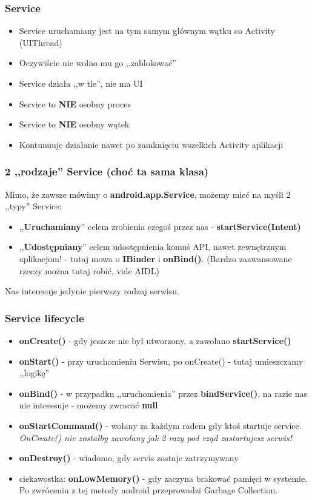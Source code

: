 \documentclass{beamer}
\begin{document}
\begin{frame}\frametitle{Service}
\begin{itemize}
 \item Service uruchamiany jest na tym samym głównym wątku co Activity (UIThread)
 \pause \item Oczywiście nie wolno mu go ,,zablokować''
 \pause \item Service działa ,,w tle'', nie ma UI
 \pause \item Service to \textbf{NIE} osobny proces
 \pause \item Service to \textbf{NIE} osobny wątek
 \pause \item Kontunuuje działanie nawet po zamknięciu wszelkich Activity aplikacji
\end{itemize}
\end{frame}

\begin{frame}\frametitle{2 ,,rodzaje'' Service (choć ta sama klasa)}
Mimo, że zawsze mówimy o \textbf{android.app.Service}, możemy mieć na myśli 2 ,,typy'' Service:
\begin{itemize}
 \pause \item ,,\textbf{Uruchamiany}'' celem zrobienia czegoś przez nas - \textbf{startService(Intent)}
 \pause \item ,,\textbf{Udostępniany}'' celem udostępnienia komuś API, nawet zewnętrznym aplikacjom! - tutaj mowa o \textbf{IBinder} i \textbf{onBind()}. (Bardzo zaawansowane rzeczy można tutaj robić, vide AIDL)
\end{itemize}
\pause Nas interesuje jedynie pierwszy rodzaj serwisu.
\end{frame}

\begin{frame}\frametitle{Service lifecycle}
 \begin{itemize}
  \item \textbf{onCreate()} - gdy jeszcze nie był utworzony, a zawołano \textbf{startService()}
  \pause \item \textbf{onStart()} - przy uruchomieniu Serwisu, po onCreate() - tutaj umieszczamy ,,logikę''
  \pause \item \textbf{onBind()} - w przypadku ,,uruchomienia'' przez \textbf{bindService()}, na razie nas nie interesuje - możemy zwracać \textbf{null}
  \pause \item \textbf{onStartCommand()} - wołany za każdym radem gdy ktoś startuje service. \textit{OnCreate() nie zostałby zawołany jak 2 razy pod rząd zastartujesz serwis!}
  \pause \item \textbf{onDestroy()} - wiadomo, gdy servis zostaje zatrzymywany
  \pause \item ciekawostka: \textbf{onLowMemory()} - gdy zaczyna brakować pamięci w systemie. Po zwróceniu z tej metody android przeprowadzi Garbage Collection.
 \end{itemize}
\end{frame}
\end{document}
